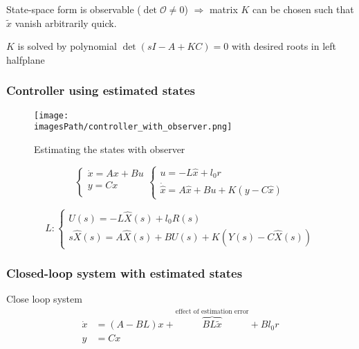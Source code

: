 State-space form is observable ($\det{\mathcal{O}}\neq0$) $\Rightarrow$ matrix $K$ can
be chosen such that $\tilde{x}$ vanish arbitrarily quick.

$K$ is solved by polynomial $\det(sI-A+KC)=0$ with desired roots in left halfplane

\subsubsection{Controller using estimated states}
\begin{figure}[!h]
    \centering
    \texttt{[image: \\imagesPath/controller\_with\_observer.png]}
    \caption{Estimating the states with observer}
\end{figure}

\begin{equation*}
    \begin{cases}
        \dot{x} = Ax + Bu \\
        y = Cx \\
    \end{cases}
    \begin{cases}
       u = -L\hat{x} + l_0r \\
       \dot{\hat{x}} = A\hat{x} + Bu + K(y-C\hat{x})
    \end{cases}
\end{equation*}

\begin{equation*}
    L: 
    \begin{cases}
        U(s) = -L\hat{X}(s) + l_0R(s) \\
        s\hat{X}(s) = A\hat{X}(s) + BU(s) + K(Y(s) - C\hat{X}(s))
    \end{cases}
\end{equation*}

\subsubsection{Closed-loop system with estimated states}
Close loop system
\begin{align*}
    \dot{x} &= (A-BL)x + \overbrace{BL\tilde{x}}^{\text{effect of estimation error}} + Bl_0r \\
    y &= Cx
\end{align*}

